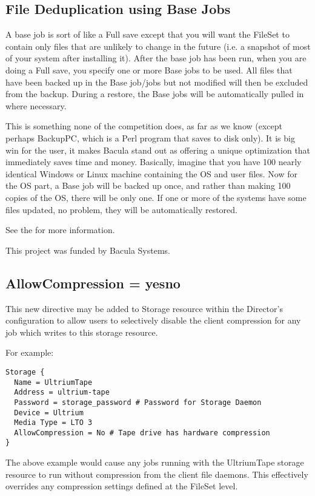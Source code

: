 \subsection{File Deduplication using Base Jobs}
A base job is sort of like a Full save except that you will want the FileSet to
contain only files that are unlikely to change in the future (i.e.  a snapshot
of most of your system after installing it).  After the base job has been run,
when you are doing a Full save, you specify one or more Base jobs to be used.
All files that have been backed up in the Base job/jobs but not modified will
then be excluded from the backup.  During a restore, the Base jobs will be
automatically pulled in where necessary.

This is something none of the competition does, as far as we know (except
perhaps BackupPC, which is a Perl program that saves to disk only).  It is big
win for the user, it makes Bacula stand out as offering a unique optimization
that immediately saves time and money.  Basically, imagine that you have 100
nearly identical Windows or Linux machine containing the OS and user files.
Now for the OS part, a Base job will be backed up once, and rather than making
100 copies of the OS, there will be only one.  If one or more of the systems
have some files updated, no problem, they will be automatically restored.

See the  for more information.

This project was funded by Bacula Systems.

\subsection{AllowCompression = \lt{}yes\vb{}no\gt{}}

This new directive may be added to Storage resource within the Director's
configuration to allow users to selectively disable the client compression for
any job which writes to this storage resource.

For example:
\begin{verbatim}
Storage {
  Name = UltriumTape
  Address = ultrium-tape
  Password = storage_password # Password for Storage Daemon
  Device = Ultrium
  Media Type = LTO 3
  AllowCompression = No # Tape drive has hardware compression
}
\end{verbatim}
The above example would cause any jobs running with the UltriumTape storage
resource to run without compression from the client file daemons.  This
effectively overrides any compression settings defined at the FileSet level.

